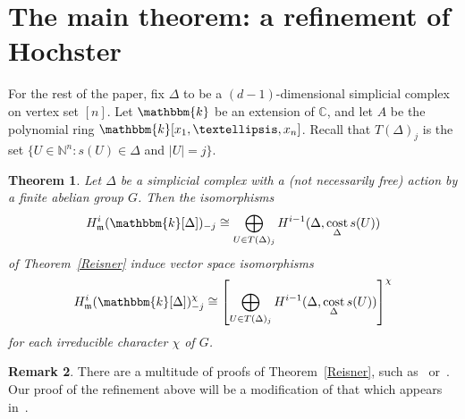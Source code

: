 \documentclass[10pt]{amsart}
\newtheorem{theo}{Theorem}[section]
\theoremstyle{definition}
\newtheorem{rema}[theo]{Remark}
\DeclareMathOperator\cost{cost}
\newcommand{\field}{\mathbbm{k}}
\newcommand{\NN}{{\mathbb N}}
\newcommand{\CC}{{\mathbb C}}
\newcommand{\mideal}{\ensuremath{\mathfrak{m}}}
\begin{document}
\section{The main theorem: a refinement of Hochster}\label{ReisnerSection}

For the rest of the paper, fix $\Delta$ to be a $(d-1)$-dimensional simplicial complex on vertex set $[n]$. Let $\field$ be an extension of $\CC$, and let $A$ be the polynomial ring $\field[x_1, \ldots, x_n]$. Recall that $T(\Delta)_j$ is the set $\{U\in \NN^n: s(U)\in \Delta$ and $ |U|=j\}$.

\begin{theo}\label{ReisnerAnalog}
Let $\Delta$ be a simplicial complex with a (not necessarily free) action by a finite abelian group $G$. Then the isomorphisms
\[
H_\mideal^i(\field[\Delta])_{-j}\cong \bigoplus_{U\in T(\Delta)_j}H^{i-1}(\Delta, \cost_\Delta s(U))
\]
of Theorem~\ref{Reisner} induce vector space isomorphisms
\[
H_\mideal^i(\field[\Delta])_{-j}^\chi\cong \left[\bigoplus_{U\in T(\Delta)_j}H^{i-1}(\Delta, \cost_\Delta s(U))\right]^{\chi}
\]
for each irreducible character $\chi$ of $G$.
\end{theo}

\begin{rema}
There are a multitude of proofs of Theorem~\ref{Reisner}, such as~\cite[Theorem~1]{Grabe} or~\cite[Corollary~4.4]{canonicalMap}. Our proof of the refinement above will be a modification of that which appears in~\cite{characterizations}.
\end{rema}
\end{document}
